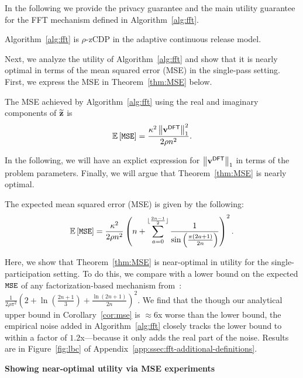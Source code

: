  In the following we provide the privacy guarantee and the main utility guarantee  for the FFT mechanism defined in Algorithm~\ref{alg:fft}.
\begin{thm}
Algorithm~\ref{alg:fft} is $\rho$-zCDP in the adaptive continuous release model.
\label{thm:privFFT}
\end{thm}
Next, we analyze the utility of Algorithm~\ref{alg:fft} and show that it is nearly optimal in terms of the mean squared error (MSE) in the single-pass setting. First, we express the MSE in Theorem~\ref{thm:MSE} below.
\begin{thm}
The MSE achieved by Algorithm~\ref{alg:fft} using the real and imaginary components of $\widetilde{\mathbf{z}}$ is
$$\mathbb{E}\left[\texttt{MSE}\right]=\frac{\kappa^2\left\|\mathbf{v}^{\sf DFT}\right\|_1^2}{2\rho n^2}.$$
\label{thm:MSE}
\end{thm}
In the following, we will have an explict expression for $\left\|\mathbf{v}^{\sf DFT}\right\|_1$ in terms of the problem parameters. Finally, we will argue that Theorem~\ref{thm:MSE} is nearly optimal.


\begin{cor}
The expected mean squared error (MSE) is given by the following:
$$\mathbb{E}\left[\texttt{MSE}\right]=\frac{\kappa^2}{2\rho n^2}\left(n+\sum\limits_{a=0}^{\lfloor\frac{2n-1}{2}\rfloor}\frac{1}{\sin\left(\frac{\pi(2a+1)}{2n}\right)}\right)^2.$$
\label{cor:mse}
\end{cor}





\vspace{-1em}
 Here, we show that Theorem~\ref{thm:MSE} is near-optimal in utility for the single-participation setting.
To do this, we compare with a lower bound on the expected $\texttt{MSE}$ of any factorization-based mechanism
from~\citet[Theorem 2]{HUU22}: $\frac{1}{2\rho\pi^2}\left(2+\ln\left(\frac{2n+1}{3}\right)+\frac{\ln(2n+1)}{2n}\right)^2$. We find that the though our analytical upper bound in Corollary~\ref{cor:mse} is $\approx6$x worse than the lower bound, the empirical noise added in Algorithm~\ref{alg:fft} closely tracks the lower bound to within a factor of $1.2$x---because it only adds the real part of the noise. Results are in Figure~\ref{fig:lbc} of Appendix~\ref{app:ssec:fft-additional-definitions}.

\textbf{Showing near-optimal utility via MSE experiments}
\FloatBarrier  %

